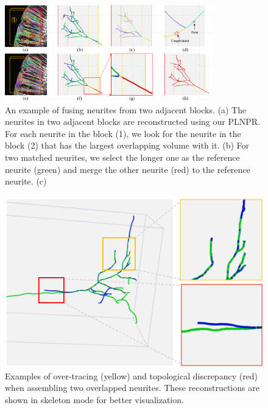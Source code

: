 
\begin{figure}[t]
	\centering
	\includegraphics[width=0.8\textwidth]{./Illustrations/fusion_algorithm.png}
	\caption{An example of fusing neurites from two adjacent blocks.  (a) The neurites in two adjacent blocks are reconstructed using our PLNPR. For each neurite in the block (1), we look for the neurite in the block (2) that has the largest overlapping volume with it. (b) For two matched neurites, we select the longer one as the reference neurite (green) and merge the other neurite (red) to the reference neurite. (c) }
	\label{fig:fusion_algorithm}
\end{figure}

\begin{figure}[th]
	\centering
	\includegraphics[width=0.9\columnwidth]{./Illustrations/neuorns_fusion6.png}
	\caption{Examples of over-tracing (yellow) and topological discrepancy (red) when assembling two overlapped neurites. These reconstructions are shown in skeleton mode for better visualization.}
	\label{fig:overlap_discrepancy}
\end{figure}

